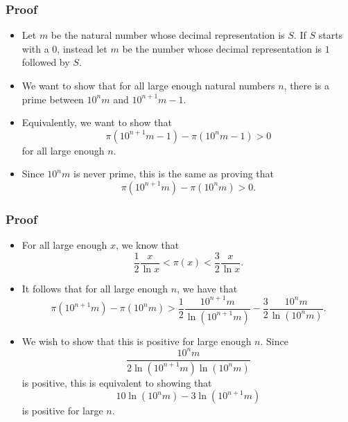 \documentclass{beamer}
\begin{document}
\begin{frame}
    \frametitle{Proof}

    \begin{itemize}
        \item Let $m$ be the natural number whose decimal representation is $S$. If $S$ starts with a $0$, instead let $m$ be the number whose decimal representation is $1$ followed by $S$. \pause
        \item We want to show that for all large enough natural numbers $n$, there is a prime between $10^n m$ and $10^{n + 1} m - 1$. \pause
        \item Equivalently, we want to show that
        \[
            \pi\left( 10^{n + 1} m - 1\right) - \pi\left( 10^n m - 1 \right) > 0
        \]
        for all large enough $n$. \pause
        \item Since $10^n m$ is never prime, this is the same as proving that
        \[
            \pi\left( 10^{n + 1} m \right) - \pi\left( 10^n m \right) > 0.
        \]
    \end{itemize}

\end{frame}

\begin{frame}
    \frametitle{Proof}

    \begin{itemize}
        \item For all large enough $x$, we know that
        \[
            \frac{1}{2} \frac{x}{\ln x} < \pi(x) < \frac{3}{2} \frac{x}{\ln x}.
        \]
        \pause
        \item It follows that for all large enough $n$, we have that
        \[
            \pi\left( 10^{n + 1} m \right) - \pi\left( 10^n m \right) > \frac{1}{2} \frac{10^{n + 1} m}{\ln\left( 10^{n + 1} m \right)} - \frac{3}{2} \frac{10^n m}{\ln\left( 10^n m \right)}.
        \]
        \pause
        \item We wish to show that this is positive for large enough $n$. Since
        \[
            \frac{10^n m}{2 \ln\left( 10^{n + 1} m \right) \ln\left( 10^n m \right)}
        \]
        is positive, this is equivalent to showing that
        \[
            10 \ln\left( 10^n m \right) - 3 \ln\left( 10^{n + 1} m \right)
        \]
        is positive for large $n$.
    \end{itemize}

\end{frame}
\end{document}

